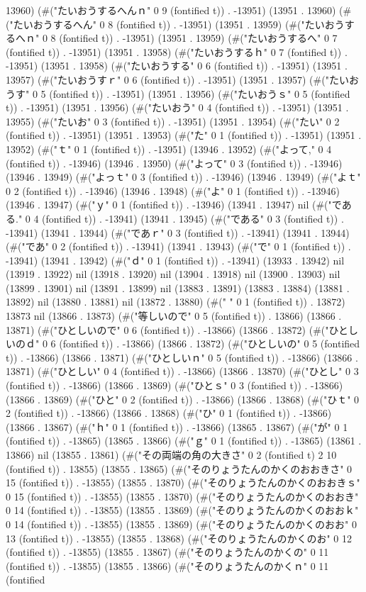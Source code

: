 13960) (#("たいおうするへんｎ" 0 9 (fontified t)) . -13951) (13951 . 13960) (#("たいおうするへん" 0 8 (fontified t)) . -13951) (13951 . 13959) (#("たいおうするへｎ" 0 8 (fontified t)) . -13951) (13951 . 13959) (#("たいおうするへ" 0 7 (fontified t)) . -13951) (13951 . 13958) (#("たいおうするｈ" 0 7 (fontified t)) . -13951) (13951 . 13958) (#("たいおうする" 0 6 (fontified t)) . -13951) (13951 . 13957) (#("たいおうすｒ" 0 6 (fontified t)) . -13951) (13951 . 13957) (#("たいおうす" 0 5 (fontified t)) . -13951) (13951 . 13956) (#("たいおうｓ" 0 5 (fontified t)) . -13951) (13951 . 13956) (#("たいおう" 0 4 (fontified t)) . -13951) (13951 . 13955) (#("たいお" 0 3 (fontified t)) . -13951) (13951 . 13954) (#("たい" 0 2 (fontified t)) . -13951) (13951 . 13953) (#("た" 0 1 (fontified t)) . -13951) (13951 . 13952) (#("ｔ" 0 1 (fontified t)) . -13951) (13946 . 13952) (#("よって," 0 4 (fontified t)) . -13946) (13946 . 13950) (#("よって" 0 3 (fontified t)) . -13946) (13946 . 13949) (#("よっｔ" 0 3 (fontified t)) . -13946) (13946 . 13949) (#("よｔ" 0 2 (fontified t)) . -13946) (13946 . 13948) (#("よ" 0 1 (fontified t)) . -13946) (13946 . 13947) (#("ｙ" 0 1 (fontified t)) . -13946) (13941 . 13947) nil (#("である." 0 4 (fontified t)) . -13941) (13941 . 13945) (#("である" 0 3 (fontified t)) . -13941) (13941 . 13944) (#("であｒ" 0 3 (fontified t)) . -13941) (13941 . 13944) (#("であ" 0 2 (fontified t)) . -13941) (13941 . 13943) (#("で" 0 1 (fontified t)) . -13941) (13941 . 13942) (#("ｄ" 0 1 (fontified t)) . -13941) (13933 . 13942) nil (13919 . 13922) nil (13918 . 13920) nil (13904 . 13918) nil (13900 . 13903) nil (13899 . 13901) nil (13891 . 13899) nil (13883 . 13891) (13883 . 13884) (13881 . 13892) nil (13880 . 13881) nil (13872 . 13880) (#(" " 0 1 (fontified t)) . 13872) 13873 nil (13866 . 13873) (#("等しいので" 0 5 (fontified t)) . 13866) (13866 . 13871) (#("ひとしいので" 0 6 (fontified t)) . -13866) (13866 . 13872) (#("ひとしいのｄ" 0 6 (fontified t)) . -13866) (13866 . 13872) (#("ひとしいの" 0 5 (fontified t)) . -13866) (13866 . 13871) (#("ひとしいｎ" 0 5 (fontified t)) . -13866) (13866 . 13871) (#("ひとしい" 0 4 (fontified t)) . -13866) (13866 . 13870) (#("ひとし" 0 3 (fontified t)) . -13866) (13866 . 13869) (#("ひとｓ" 0 3 (fontified t)) . -13866) (13866 . 13869) (#("ひと" 0 2 (fontified t)) . -13866) (13866 . 13868) (#("ひｔ" 0 2 (fontified t)) . -13866) (13866 . 13868) (#("ひ" 0 1 (fontified t)) . -13866) (13866 . 13867) (#("ｈ" 0 1 (fontified t)) . -13866) (13865 . 13867) (#("が" 0 1 (fontified t)) . -13865) (13865 . 13866) (#("ｇ" 0 1 (fontified t)) . -13865) (13861 . 13866) nil (13855 . 13861) (#("その両端の角の大きさ" 0 2 (fontified t) 2 10 (fontified t)) . 13855) (13855 . 13865) (#("そのりょうたんのかくのおおきさ" 0 15 (fontified t)) . -13855) (13855 . 13870) (#("そのりょうたんのかくのおおきｓ" 0 15 (fontified t)) . -13855) (13855 . 13870) (#("そのりょうたんのかくのおおき" 0 14 (fontified t)) . -13855) (13855 . 13869) (#("そのりょうたんのかくのおおｋ" 0 14 (fontified t)) . -13855) (13855 . 13869) (#("そのりょうたんのかくのおお" 0 13 (fontified t)) . -13855) (13855 . 13868) (#("そのりょうたんのかくのお" 0 12 (fontified t)) . -13855) (13855 . 13867) (#("そのりょうたんのかくの" 0 11 (fontified t)) . -13855) (13855 . 13866) (#("そのりょうたんのかくｎ" 0 11 (fontified 
